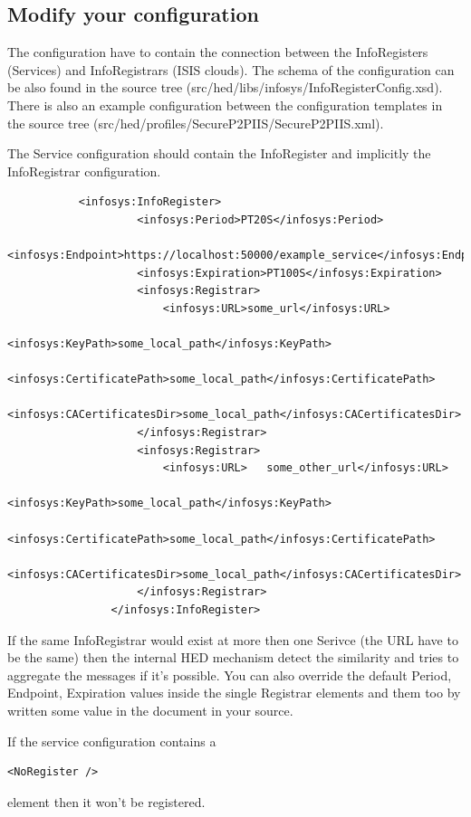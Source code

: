 \subsection{Modify your configuration}
\label{Modify your configuration}
The configuration have to contain the connection between the InfoRegisters (Services) and InfoRegistrars (ISIS clouds). The schema of the configuration can be also found in the source tree (src/hed/libs/infosys/InfoRegisterConfig.xsd). There is also an example configuration between the configuration templates in the source tree (src/hed/profiles/SecureP2PIIS/SecureP2PIIS.xml).

The Service configuration should contain the InfoRegister and implicitly the InfoRegistrar configuration.
\begin{verbatim}
           <infosys:InfoRegister>
	                <infosys:Period>PT20S</infosys:Period>
	                <infosys:Endpoint>https://localhost:50000/example_service</infosys:Endpoint>
	                <infosys:Expiration>PT100S</infosys:Expiration>
	                <infosys:Registrar>
	                    <infosys:URL>some_url</infosys:URL>
	                    <infosys:KeyPath>some_local_path</infosys:KeyPath>
	                    <infosys:CertificatePath>some_local_path</infosys:CertificatePath>
	                    <infosys:CACertificatesDir>some_local_path</infosys:CACertificatesDir>
	                </infosys:Registrar>
	                <infosys:Registrar>
	                    <infosys:URL>	some_other_url</infosys:URL>
	                    <infosys:KeyPath>some_local_path</infosys:KeyPath>
	                    <infosys:CertificatePath>some_local_path</infosys:CertificatePath>
	                    <infosys:CACertificatesDir>some_local_path</infosys:CACertificatesDir>
	                </infosys:Registrar>
	            </infosys:InfoRegister>
\end{verbatim}
If the same InfoRegistrar would exist at more then one Serivce (the URL have to be the same) then the internal HED mechanism detect the similarity and tries to aggregate the messages if it's possible. You can also override the default Period, Endpoint, Expiration values inside the single Registrar elements and them too by written some value in the document in your source.

If the service configuration contains a \begin{verbatim}<NoRegister />\end{verbatim} element then it won't be registered.
